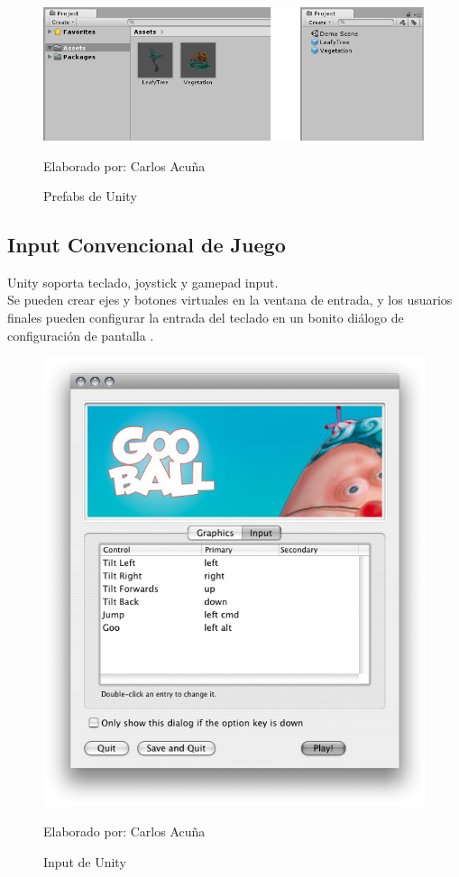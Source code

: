 \documentclass[a4paper, openright, 12pt]{report}
\begin{document}
\begin{figure}[h]
\captionsetup{justification=centering,margin=2cm}
\includegraphics[scale=0.4]{unity08}
\centering
\caption{Prefabs de Unity}
Elaborado por: Carlos Acuña
\label{fig:unity08}
\end{figure}

\subsection*{Input Convencional de Juego}
\justify
Unity soporta teclado, joystick y gamepad input.\\
Se pueden crear ejes y botones virtuales en la ventana de entrada, y los usuarios finales pueden configurar la entrada del teclado en un bonito diálogo de configuración de pantalla \cite{2020unity}.

\begin{figure}[h]
\captionsetup{justification=centering,margin=2cm}
\includegraphics[scale=0.4]{unity09}
\centering
\caption{Input de Unity}
Elaborado por: Carlos Acuña
\label{fig:unity09}
\end{figure}
\end{document}
